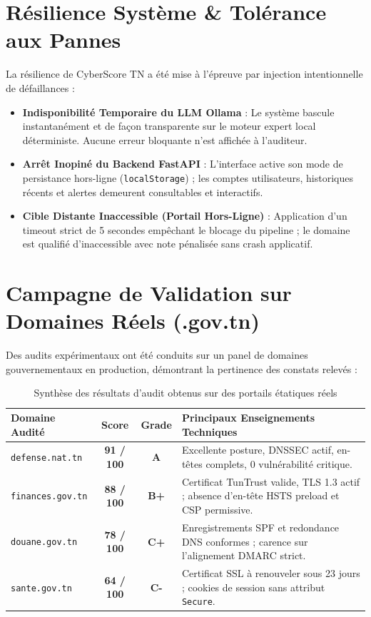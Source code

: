 \section{Résilience Système \& Tolérance aux Pannes}
La résilience de CyberScore TN a été mise à l'épreuve par injection intentionnelle de défaillances :
\begin{itemize}
    \item \textbf{Indisponibilité Temporaire du LLM Ollama} : Le système bascule instantanément et de façon transparente sur le moteur expert local déterministe. Aucune erreur bloquante n'est affichée à l'auditeur.
    \item \textbf{Arrêt Inopiné du Backend FastAPI} : L'interface active son mode de persistance hors-ligne (\texttt{localStorage}) ; les comptes utilisateurs, historiques récents et alertes demeurent consultables et interactifs.
    \item \textbf{Cible Distante Inaccessible (Portail Hors-Ligne)} : Application d'un timeout strict de 5 secondes empêchant le blocage du pipeline ; le domaine est qualifié d'inaccessible avec note pénalisée sans crash applicatif.
\end{itemize}

\section{Campagne de Validation sur Domaines Réels (.gov.tn)}
Des audits expérimentaux ont été conduits sur un panel de domaines gouvernementaux en production, démontrant la pertinence des constats relevés :

\begin{table}[!htbp]
\centering
\caption{Synthèse des résultats d'audit obtenus sur des portails étatiques réels}
\label{tab:audit_reel}
\begin{singlespace}
\footnotesize
\renewcommand{\arraystretch}{1.1}
\begin{tabularx}{\textwidth}{l c c X}
\toprule
\textbf{Domaine Audité} & \textbf{Score} & \textbf{Grade} & \textbf{Principaux Enseignements Techniques} \\
\midrule
\texttt{defense.nat.tn} & \textbf{91 / 100} & \textbf{A} & Excellente posture, DNSSEC actif, en-têtes complets, 0 vulnérabilité critique. \\
\texttt{finances.gov.tn} & \textbf{88 / 100} & \textbf{B+} & Certificat TunTrust valide, TLS 1.3 actif ; absence d'en-tête HSTS preload et CSP permissive. \\
\texttt{douane.gov.tn} & \textbf{78 / 100} & \textbf{C+} & Enregistrements SPF et redondance DNS conformes ; carence sur l'alignement DMARC strict. \\
\texttt{sante.gov.tn} & \textbf{64 / 100} & \textbf{C-} & Certificat SSL à renouveler sous 23 jours ; cookies de session sans attribut \texttt{Secure}. \\
\bottomrule
\end{tabularx}
\end{singlespace}
\end{table}

